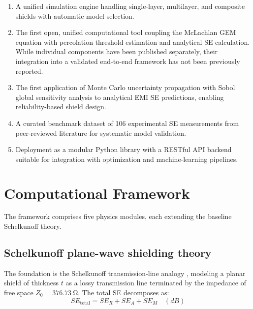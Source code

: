 \documentclass[review,3p,authoryear]{elsarticle}
\begin{document}
\begin{enumerate}
\item[(a)] A unified simulation engine handling single-layer, multilayer, and composite shields with automatic model selection.

\item[(b)] The first open, unified computational tool coupling the McLachlan GEM equation with percolation threshold estimation and analytical SE calculation. While individual components have been published separately, their integration into a validated end-to-end framework has not been previously reported.

\item[(c)] The first application of Monte Carlo uncertainty propagation with Sobol global sensitivity analysis to analytical EMI SE predictions, enabling reliability-based shield design.

\item[(d)] A curated benchmark dataset of 106 experimental SE measurements from peer-reviewed literature for systematic model validation.

\item[(e)] Deployment as a modular Python library with a RESTful API backend suitable for integration with optimization and machine-learning pipelines.
\end{enumerate}

\section{Computational Framework}
\label{sec:framework}

The framework comprises five physics modules, each extending the baseline Schelkunoff theory.

\subsection{Schelkunoff plane-wave shielding theory}
\label{sec:schelkunoff}

The foundation is the Schelkunoff transmission-line analogy \citep{Schelkunoff1934}, modeling a planar shield of thickness $t$ as a lossy transmission line terminated by the impedance of free space $Z_0 = \SI{376.73}{\ohm}$. The total SE decomposes as:
\begin{equation}
SE_\mathrm{total} = SE_R + SE_A + SE_M \quad (\si{dB})
\label{eq:se_total}
\end{equation}
\end{document}
